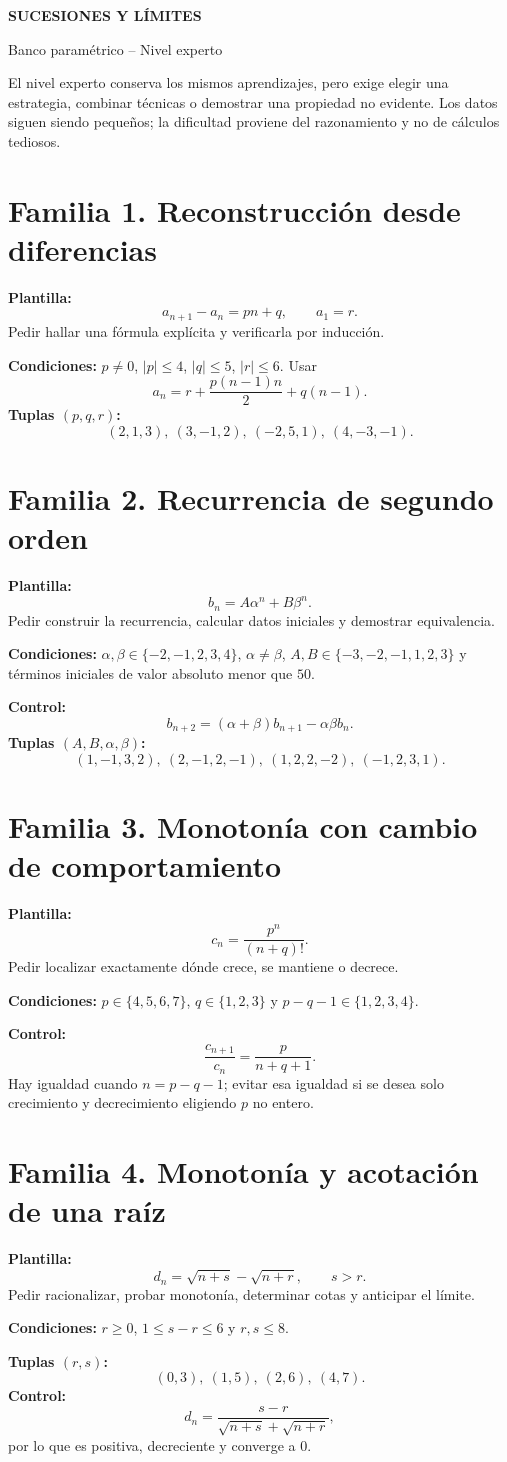 \documentclass[12pt,letterpaper]{article}
\newcommand{\familia}[2]{\section*{Familia #1. #2}}
\newcommand{\campo}[1]{\textcolor{azul}{\textbf{#1}}}
\begin{document}
\begin{center}
{\LARGE\bfseries\color{azul} SUCESIONES Y LÍMITES}\par
{\Large Banco paramétrico -- Nivel experto}
\end{center}
\begin{tcolorbox}[colback=claro,colframe=azul]
El nivel experto conserva los mismos aprendizajes, pero exige elegir una estrategia,
combinar técnicas o demostrar una propiedad no evidente. Los datos siguen siendo
pequeños; la dificultad proviene del razonamiento y no de cálculos tediosos.
\end{tcolorbox}

\familia{1}{Reconstrucción desde diferencias}
\campo{Plantilla:}
\[
 a_{n+1}-a_n=pn+q,\qquad a_1=r.
\]
Pedir hallar una fórmula explícita y verificarla por inducción.\par
\campo{Condiciones:} $p\neq0$, $|p|\leq4$, $|q|\leq5$, $|r|\leq6$.
Usar
\[
 a_n=r+\frac{p(n-1)n}{2}+q(n-1).
\]
\campo{Tuplas $(p,q,r)$:}
\[
 (2,1,3),\ (3,-1,2),\ (-2,5,1),\ (4,-3,-1).
\]

\familia{2}{Recurrencia de segundo orden}
\campo{Plantilla:}
\[
 b_n=A\alpha^n+B\beta^n.
\]
Pedir construir la recurrencia, calcular datos iniciales y demostrar equivalencia.\par
\campo{Condiciones:} $\alpha,\beta\in\{-2,-1,2,3,4\}$, $\alpha\neq\beta$,
$A,B\in\{-3,-2,-1,1,2,3\}$ y términos iniciales de valor absoluto menor que $50$.\par
\campo{Control:}
\[
 b_{n+2}=(\alpha+\beta)b_{n+1}-\alpha\beta b_n.
\]
\campo{Tuplas $(A,B,\alpha,\beta)$:}
\[
 (1,-1,3,2),\ (2,-1,2,-1),\ (1,2,2,-2),\ (-1,2,3,1).
\]

\familia{3}{Monotonía con cambio de comportamiento}
\campo{Plantilla:}
\[
 c_n=\frac{p^n}{(n+q)!}.
\]
Pedir localizar exactamente dónde crece, se mantiene o decrece.\par
\campo{Condiciones:} $p\in\{4,5,6,7\}$, $q\in\{1,2,3\}$ y
$p-q-1\in\{1,2,3,4\}$.\par
\campo{Control:}
\[
 \frac{c_{n+1}}{c_n}=\frac{p}{n+q+1}.
\]
Hay igualdad cuando $n=p-q-1$; evitar esa igualdad si se desea solo crecimiento
y decrecimiento eligiendo $p$ no entero.

\familia{4}{Monotonía y acotación de una raíz}
\campo{Plantilla:}
\[
 d_n=\sqrt{n+s}-\sqrt{n+r},\qquad s>r.
\]
Pedir racionalizar, probar monotonía, determinar cotas y anticipar el límite.\par
\campo{Condiciones:} $r\geq0$, $1\leq s-r\leq6$ y $r,s\leq8$.\par
\campo{Tuplas $(r,s)$:}
\[
 (0,3),\ (1,5),\ (2,6),\ (4,7).
\]
\campo{Control:}
\[
 d_n=\frac{s-r}{\sqrt{n+s}+\sqrt{n+r}},
\]
por lo que es positiva, decreciente y converge a $0$.
\end{document}
